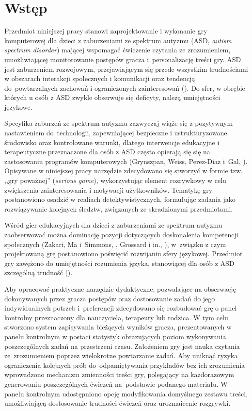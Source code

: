 \chapter{Wstęp}
\thispagestyle{firststyle}

Przedmiot niniejszej pracy stanowi zaprojektowanie i wykonanie gry komputerowej dla dzieci z zaburzeniami ze spektrum autyzmu (ASD, \emph{autism spectrum disorder}) mającej wspomagać ćwiczenie czytania ze zrozumieniem, umożliwiającej monitorowanie postępów gracza i~personalizację treści gry.
ASD jest zaburzeniem rozwojowym, przejawiającym się przede wszystkim trudnościami w obszarach interakcji społecznych i komunikacji oraz tendencją do~powtarzalnych zachowań i ograniczonych zainteresowań (\cite{frith2008autyzm}).
Do sfer, w obrębie których u osób z ASD zwykle obserwuje się deficyty, należą umiejętności językowe.

Specyfika zaburzeń ze spektrum autyzmu zazwyczaj wiąże się z pozytywnym nastawieniem do~technologii, zapewniającej bezpieczne i ustrukturyzowane środowisko oraz kontrolowane warunki, dlatego interwencje edukacyjne i terapeutyczne przeznaczone dla osób z ASD często opierają się się na zastosowaniu programów komputerowych (Grynszpan, Weiss, Perez-Diaz i~Gal, \cite*{grynszpan2014innovative}).
Opisywane w niniejszej pracy narzędzie zdecydowano się stworzyć w formie tzw. ,,gry poważnej'' (\emph{serious game}), wykorzystując element rozrywkowy w celu zwiększenia zainteresowania i motywacji użytkowników.
Tematykę gry postanowiono osadzić w realiach detektywistycznych, formułując zadania jako rozwiązywanie kolejnych śledztw, związanych ze skradzionymi przedmiotami.

Wśród gier edukacyjnych dla dzieci z zaburzeniami ze spektrum autyzmu zaobserwować można dominację pozycji dotyczących doskonalenia kompetencji społecznych (Zakari, Ma i~Simmons, \cite*{zakari2014review}, Grossard i in., \cite*{grossard2017serious}), w~związku z czym projektowaną grę postanowiono poświęcić rozwijaniu sfery językowej.
Przedmiot gry zawężono do umiejętności rozumienia języka, stanowiącej dla osób z ASD szczególną trudność (\cite{tager1981nature}).

Aby opracować praktyczne narzędzie dydaktyczne, pozwalające na obserwację dokonywanych przez gracza postępów oraz dostosowanie zadań do jego indywidualnych potrzeb i~preferencji zdecydowano się rozbudować grę o panel kontrolny przeznaczony dla nauczyciela, terapeuty lub rodzica.
W tym celu stworzono system zapisywania bieżących wyników gracza, prezentowanych w panelu kontrolnym w postaci statystyk obrazujących poziom wykonywania poszczególnych zadań na przestrzeni czasu.
Założeniem gry jest nauka czytania ze~zrozumieniem poprzez wielokrotne powtarzanie zadań.
Aby uniknąć ryzyka ograniczenia kolejnych prób do~odpamiętywania przykładów bez ich zrozumienia wprowadzono mechanizm zmienności treści gry, polegający na każdorazowym generowaniu poszczególnych ćwiczeń na~podstawie podanego materiału.
W panelu kontrolnym udostępniono opcję modyfikowania domyślnego zestawu treści, umożliwiającą dostosowanie trudności ćwiczeń oraz urozmaicenie rozgrywki.

